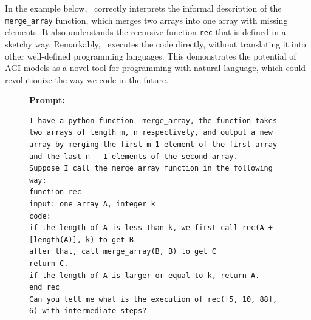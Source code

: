 In the example below, \DV\ correctly interprets the informal description of the \texttt{merge\_array} function, which merges two arrays into one array with missing elements. It also understands the recursive function \texttt{rec} that is defined in a sketchy way. Remarkably, \DV \ executes the code directly, without translating it into other well-defined programming languages. This demonstrates the potential of AGI models as a novel tool for programming with natural language, which could revolutionize the way we code in the future.


\begin{figure}[H]
\begin{AIbox}{\DV}
{\bf Prompt:} \begin{verbatim}
I have a python function  merge_array, the function takes two arrays of length m, n respectively, and output a new array by merging the first m-1 element of the first array and the last n - 1 elements of the second array.
Suppose I call the merge_array function in the following way:
function rec
input: one array A, integer k
code: 
if the length of A is less than k, we first call rec(A + [length(A)], k) to get B
after that, call merge_array(B, B) to get C
return C.
if the length of A is larger or equal to k, return A.
end rec
Can you tell me what is the execution of rec([5, 10, 88], 6) with intermediate steps?
\end{verbatim}



\end{AIbox}
\end{figure}
